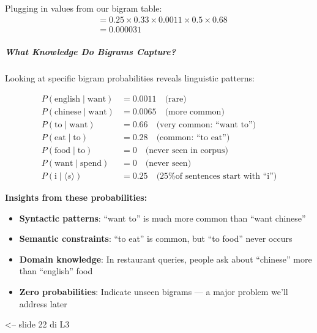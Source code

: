 \documentclass[11pt,a4paper]{article}
\theoremstyle{definition}
\theoremstyle{plain}
\theoremstyle{remark}
\begin{document}
Plugging in values from our bigram table:
\begin{align*}
&= 0.25 \times 0.33 \times 0.0011 \times 0.5 \times 0.68 \\
&= 0.000031
\end{align*}

\subsubsection{What Knowledge Do Bigrams Capture?}

Looking at specific bigram probabilities reveals linguistic patterns:

\begin{align*}
P(\text{english} \mid \text{want}) &= 0.0011 \quad \text{(rare)} \\
P(\text{chinese} \mid \text{want}) &= 0.0065 \quad \text{(more common)} \\
P(\text{to} \mid \text{want}) &= 0.66 \quad \text{(very common: ``want to'')} \\
P(\text{eat} \mid \text{to}) &= 0.28 \quad \text{(common: ``to eat'')} \\
P(\text{food} \mid \text{to}) &= 0 \quad \text{(never seen in corpus)} \\
P(\text{want} \mid \text{spend}) &= 0 \quad \text{(never seen)} \\
P(\text{i} \mid \langle s \rangle) &= 0.25 \quad \text{(25\% of sentences start with ``i'')}
\end{align*}

\textbf{Insights from these probabilities:}
\begin{itemize}
    \item \textbf{Syntactic patterns}: ``want to'' is much more common than ``want chinese''
    \item \textbf{Semantic constraints}: ``to eat'' is common, but ``to food'' never occurs
    \item \textbf{Domain knowledge}: In restaurant queries, people ask about ``chinese'' more than ``english'' food
    \item \textbf{Zero probabilities}: Indicate unseen bigrams — a major problem we'll address later
\end{itemize}

<-- slide 22 di L3 




\newpage

\part{}

\section{}
\end{document}
